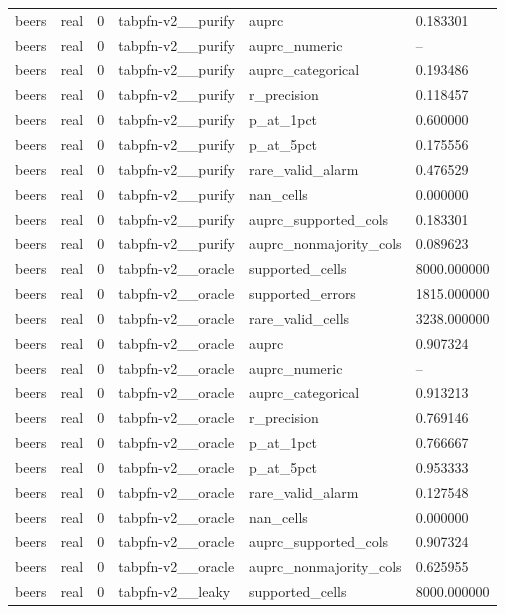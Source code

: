 \begin{tabular}{llllll}
beers & real & 0 & tabpfn-v2\_\_purify & auprc & 0.183301 \\
beers & real & 0 & tabpfn-v2\_\_purify & auprc\_numeric & -- \\
beers & real & 0 & tabpfn-v2\_\_purify & auprc\_categorical & 0.193486 \\
beers & real & 0 & tabpfn-v2\_\_purify & r\_precision & 0.118457 \\
beers & real & 0 & tabpfn-v2\_\_purify & p\_at\_1pct & 0.600000 \\
beers & real & 0 & tabpfn-v2\_\_purify & p\_at\_5pct & 0.175556 \\
beers & real & 0 & tabpfn-v2\_\_purify & rare\_valid\_alarm & 0.476529 \\
beers & real & 0 & tabpfn-v2\_\_purify & nan\_cells & 0.000000 \\
beers & real & 0 & tabpfn-v2\_\_purify & auprc\_supported\_cols & 0.183301 \\
beers & real & 0 & tabpfn-v2\_\_purify & auprc\_nonmajority\_cols & 0.089623 \\
beers & real & 0 & tabpfn-v2\_\_oracle & supported\_cells & 8000.000000 \\
beers & real & 0 & tabpfn-v2\_\_oracle & supported\_errors & 1815.000000 \\
beers & real & 0 & tabpfn-v2\_\_oracle & rare\_valid\_cells & 3238.000000 \\
beers & real & 0 & tabpfn-v2\_\_oracle & auprc & 0.907324 \\
beers & real & 0 & tabpfn-v2\_\_oracle & auprc\_numeric & -- \\
beers & real & 0 & tabpfn-v2\_\_oracle & auprc\_categorical & 0.913213 \\
beers & real & 0 & tabpfn-v2\_\_oracle & r\_precision & 0.769146 \\
beers & real & 0 & tabpfn-v2\_\_oracle & p\_at\_1pct & 0.766667 \\
beers & real & 0 & tabpfn-v2\_\_oracle & p\_at\_5pct & 0.953333 \\
beers & real & 0 & tabpfn-v2\_\_oracle & rare\_valid\_alarm & 0.127548 \\
beers & real & 0 & tabpfn-v2\_\_oracle & nan\_cells & 0.000000 \\
beers & real & 0 & tabpfn-v2\_\_oracle & auprc\_supported\_cols & 0.907324 \\
beers & real & 0 & tabpfn-v2\_\_oracle & auprc\_nonmajority\_cols & 0.625955 \\
beers & real & 0 & tabpfn-v2\_\_leaky & supported\_cells & 8000.000000 \\

\end{tabular}
